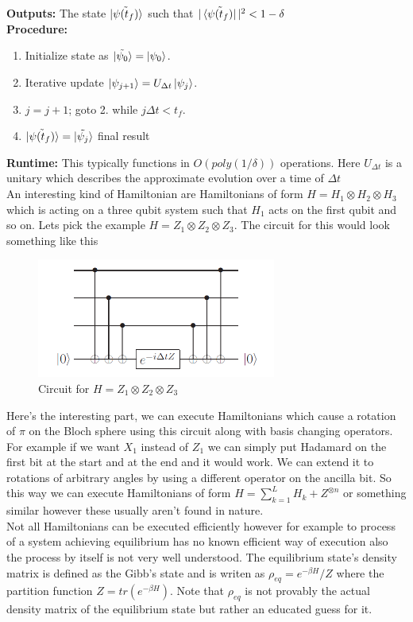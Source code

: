 \documentclass{report}
\begin{document}
\textbf{Outputs: } The state $\ket{\tilde{\psi(t_f)}}$ such that $|\bra{\tilde{\psi(t_f)}}|^2 < 1 - \delta$\\
\textbf{Procedure: }
\begin{enumerate}
\item Initialize state as $\ket{\tilde{\psi_0}} = \ket{\psi_0}$.
\item Iterative update $\ket{\psi_{j+1}} = U_{\Delta{t}}\ket{\psi_{j}}$.
\item $j = j+1$; goto 2. while $j\Delta{t} < t_f$.
\item $\ket{\tilde{\psi(t_f)}} = \ket{\tilde{\psi_j}}$ final result
\end{enumerate}
\textbf{Runtime: }This typically functions in $O(poly(1/\delta))$ operations.
Here $U_{\Delta{t}}$ is a unitary which describes the approximate evolution over a time of $\Delta{t}$\\ 
An interesting kind of Hamiltonian are Hamiltonians of form $H = {H_{1}}\otimes{H_{2}}\otimes{H_{3}}$ which is acting on a three qubit system such that $H_{1}$ acts on the first qubit and so on. Lets pick the example $H = {Z_{1}}\otimes{Z_{2}}\otimes{Z_{3}}$. The circuit for this would look something like this
\begin{figure}[ht]
    \centering
    \includegraphics[width = 0.7\textwidth]{images/hamiltonian stuff.png}
    \caption{Circuit for $H = {Z_{1}}\otimes{Z_{2}}\otimes{Z_{3}}$}
\end{figure}
Here's the interesting part, we can execute Hamiltonians which cause a rotation of $\pi$ on the Bloch sphere using this circuit along with basis changing operators. For example if we want $X_{1}$ instead of $Z_{1}$ we can simply put Hadamard on the first bit at the start and at the end and it would work. We can extend it to rotations of arbitrary angles by using a different operator on the ancilla bit. So this way we can execute Hamiltonians of form $H = \sum_{k = 1}^{L}H_{k} + Z^{\otimes{n}}$ or something similar however these usually aren't found in nature.\\
Not all Hamiltonians can be executed efficiently however for example to process of a system achieving equilibrium has no known efficient way of execution also the process by itself is not very well understood. The equilibrium state's density matrix is defined as the Gibb's state and is writen as $\rho_{eq} = e^{-\beta{H}}/Z$ where the partition function $Z = tr(e^{-\beta{H}})$. Note that $\rho_{eq}$ is not provably the actual density matrix of the equilibrium state but rather an educated guess for it.
\end{document}
